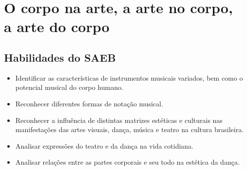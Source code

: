 \chapter[O corpo na arte, a arte no corpo, a arte do corpo]{\Large O corpo na arte, a arte no corpo,\\ a arte do corpo}

\vspace*{-1\baselineskip}


\section{Habilidades do SAEB}

\begin{itemize}
\item Identificar as características de instrumentos musicais variados, bem
como o potencial musical do corpo humano.

\item Reconhecer diferentes formas de notação musical.

\item Reconhecer a influência de distintas matrizes estéticas e culturais
nas manifestações das artes visuais, dança, música e teatro na cultura
brasileira.

\item Analisar expressões do teatro e da dança na vida cotidiana.

\item Analisar relações entre as partes corporais e seu todo na estética da dança.
\end{itemize}

